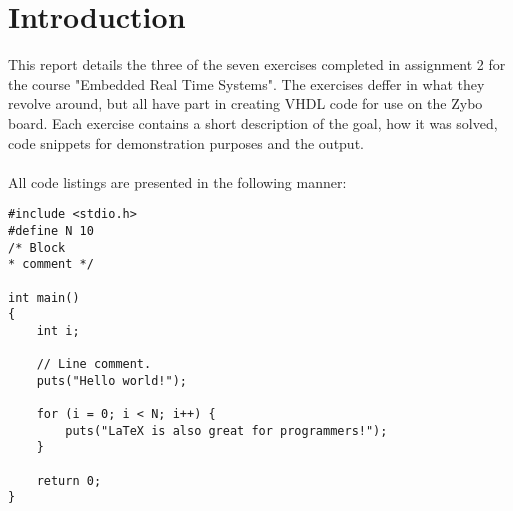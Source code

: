\section{Introduction}

This report details the three of the seven exercises completed in assignment 2 for the course "Embedded Real Time Systems". The exercises deffer in what they revolve around, but all have part in creating VHDL code for use on the Zybo board. Each exercise contains a short description of the goal, how it was solved, code snippets for demonstration purposes and the output. \\\\
All code listings are presented in the following manner:
\begin{lstlisting}[style=customc++, caption=Example listing.]
#include <stdio.h>
#define N 10
/* Block
* comment */

int main()
{
	int i;

	// Line comment.
	puts("Hello world!");

	for (i = 0; i < N; i++) {
		puts("LaTeX is also great for programmers!");
	}

	return 0;
}
\end{lstlisting}
